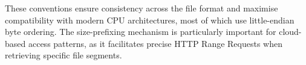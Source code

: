 These conventions ensure consistency across the file format and maximise compatibility with modern CPU architectures, most of which use little-endian byte ordering. The size-prefixing mechanism is particularly important for cloud-based access patterns, as it facilitates precise HTTP Range Requests when retrieving specific file segments.
